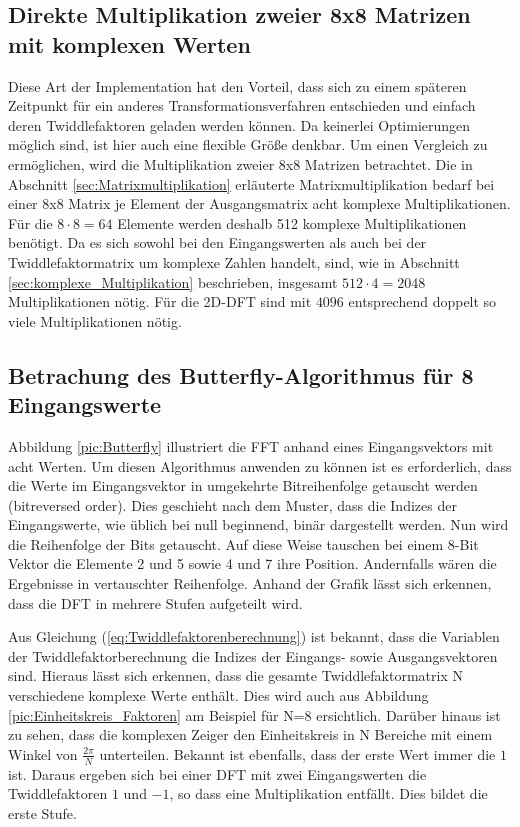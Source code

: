 \subsection{Direkte Multiplikation zweier 8x8 Matrizen mit komplexen Werten}
Diese Art der Implementation hat den Vorteil, dass sich zu einem späteren Zeitpunkt für ein anderes
Transformationsverfahren entschieden und einfach deren Twiddlefaktoren geladen werden können.
Da keinerlei Optimierungen möglich sind, ist hier auch eine flexible Größe denkbar. Um einen Vergleich
zu ermöglichen, wird die Multiplikation zweier 8x8 Matrizen betrachtet.
Die in Abschnitt \ref{sec:Matrixmultiplikation} erläuterte Matrixmultiplikation bedarf bei einer 8x8 Matrix je Element der Ausgangsmatrix acht komplexe Multiplikationen. Für
die $8\cdot8=64$ Elemente werden deshalb 512 komplexe Multiplikationen benötigt. Da es sich sowohl bei den Eingangswerten als auch bei der Twiddlefaktormatrix um komplexe
Zahlen handelt, sind, wie in Abschnitt \ref{sec:komplexe_Multiplikation} beschrieben, insgesamt $512\cdot4=2048$ Multiplikationen nötig.
Für die 2D-DFT sind mit $4096$ entsprechend doppelt so viele Multiplikationen nötig.



\subsection{Betrachung des Butterfly-Algorithmus für 8 Eingangswerte}\label{sec:AnalyseFFT}
Abbildung \ref{pic:Butterfly} illustriert die FFT anhand eines Eingangsvektors mit acht Werten. 
Um diesen Algorithmus anwenden zu können ist es erforderlich, dass die Werte im Eingangsvektor in umgekehrte Bitreihenfolge getauscht werden (bitreversed order).
Dies geschieht nach dem Muster, dass die Indizes der Eingangswerte, wie
üblich bei null beginnend, binär dargestellt werden. Nun wird die Reihenfolge der Bits getauscht. Auf diese Weise tauschen bei einem 8-Bit Vektor die
Elemente 2 und 5 sowie 4 und 7 ihre Position. Andernfalls wären die Ergebnisse in vertauschter Reihenfolge.
Anhand der Grafik lässt sich erkennen, dass die DFT in mehrere Stufen aufgeteilt wird.

Aus Gleichung (\ref{eq:Twiddlefaktorenberechnung}) ist 
bekannt, dass die Variablen der Twiddlefaktorberechnung die Indizes der Eingangs- sowie Ausgangsvektoren sind. Hieraus lässt sich erkennen, dass
die gesamte Twiddlefaktormatrix N verschiedene komplexe Werte enthält. Dies wird auch aus Abbildung \ref{pic:Einheitskreis_Faktoren} am Beispiel für N=8 ersichtlich. 
Darüber hinaus ist zu sehen, dass die komplexen Zeiger den Einheitskreis 
in N Bereiche mit einem Winkel von $\frac{2 \pi}{N}$ unterteilen. Bekannt ist ebenfalls, dass der erste Wert immer die $1$ ist.
Daraus ergeben sich bei einer DFT mit zwei Eingangswerten die Twiddlefaktoren $1$ und $-1$, so dass eine Multiplikation entfällt. Dies bildet die erste Stufe.

